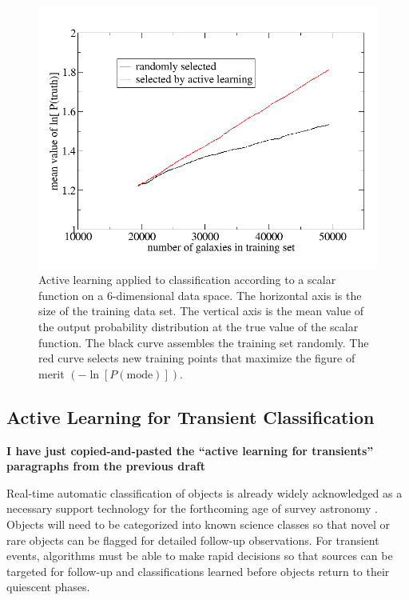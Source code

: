\documentclass[useAMS,usenatbib,tightenlines,11pt,preprint]{aastex}
\begin{document}
\begin{figure}
\centerline{
\includegraphics[scale=0.3]{learning_curve.png}
}
\caption{
Active learning applied to classification according to a scalar function on a
6-dimensional data space.  The horizontal axis is the size of the training data
set.  The vertical axis is the mean value of the output probability distribution
at the true value of the scalar function.  The black curve assembles the
training set randomly.  The red curve selects new training points that maximize
the figure of merit $\left(-\ln[P(\text{mode})]\right)$.
}
\label{fig:learning}
\end{figure}

\subsection{Active Learning for Transient Classification}


{\bf I have just copied-and-pasted the ``active learning for transients''
paragraphs from the previous draft}


Real-time automatic classification of objects is already widely acknowledged as a
necessary support technology for the forthcoming age of survey astronomy
\cite{djorgovski2011,richards2011,richards2012,graham2012,mahabal2008a,mahabal2011a}.
Objects will need to be categorized into known science classes so that novel
or rare objects can be flagged for detailed follow-up observations.
For transient events, algorithms must be able to make rapid
decisions so that sources can be targeted for follow-up 
and classifications learned before
objects return to their quiescent phases.  
\end{document}
